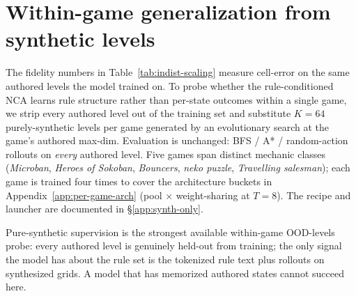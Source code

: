 
\section{Within-game generalization from synthetic levels}
\label{app:within-game}

The fidelity numbers in Table~\ref{tab:indist-scaling} measure cell-error
on the same authored levels the model trained on. To probe whether
the rule-conditioned NCA learns rule structure rather than per-state
outcomes within a single game, we strip every authored level out of
the training set and substitute $K{=}64$ purely-synthetic levels per
game generated by an evolutionary search at the game's authored
max-dim. Evaluation is unchanged: BFS / A* / random-action rollouts
on \emph{every} authored level. Five games span distinct mechanic
classes (\textit{Microban}, \textit{Heroes of Sokoban},
\textit{Bouncers}, \textit{neko puzzle},
\textit{Travelling salesman}); each game is trained four times to
cover the architecture buckets in Appendix~\ref{app:per-game-arch}
(pool $\times$ weight-sharing at $T{=}8$). The recipe and launcher
are documented in \S\ref{app:synth-only}.

Pure-synthetic supervision is the strongest available within-game
OOD-levels probe: every authored level is genuinely held-out from
training; the only signal the model has about the rule set is the
tokenized rule text plus rollouts on synthesized grids. A model that
has memorized authored states cannot succeed here.

\begin{table}[t]
  \centering
  \caption{\textbf{Synth-only $\to$ all-authored generalization.}
    Each cell is the mean BFS rollout cell-error across every authored
    level of the game, after training on $K{=}128$ purely-synthetic
    levels at the smallest-by-area authored size of the game.
    No authored level enters training. Best architecture bucket per
    game is bolded. Cells marked ``—'' are not reported here;
    the displayed \textit{Microban}-D number is the anchor result
    described below.}
  \label{tab:within-game-synth}
  \small
  
\end{table}


